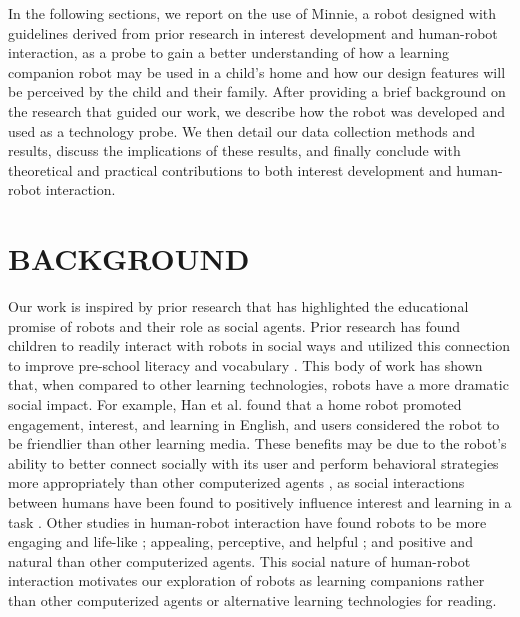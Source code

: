 \documentclass{sigchi}
\begin{document}


In the following sections, we report on the use of Minnie, a robot designed with guidelines derived from prior research in interest development and human-robot interaction, as a probe to gain a better understanding of how a learning companion robot may be used in a child's home and how our design features will be perceived by the child and their family. After providing a brief background on the research that guided our work, we describe how the robot was developed and used as a technology probe. We then detail our data collection methods and results, discuss the implications of these results, and finally conclude with theoretical and practical contributions to both interest development and human-robot interaction.

\section{BACKGROUND}
Our work is inspired by prior research that has highlighted the educational promise of robots and their role as social agents. Prior research has found children to readily interact with robots in social ways and utilized this connection to improve pre-school literacy \cite{Kory:2014} and vocabulary \cite{Spaulding:2016}. This body of work has shown that, when compared to other learning technologies, robots have a more dramatic social impact. For example, Han et al. \cite{Han:2005} found that a home robot promoted engagement, interest, and learning in English, and users considered the robot to be friendlier than other learning media. These benefits may be due to the robot's ability to better connect socially with its user and perform behavioral strategies more appropriately than other computerized agents \cite{Brown:2013}, as social interactions between humans have been found to positively influence interest and learning in a task \cite{Sansone:2005}. Other studies in human-robot interaction have found robots to be more engaging and life-like \cite{Kiesler:2008}; appealing, perceptive, and helpful \cite{Wainer:2007}; and positive and natural \cite{Bainbridge:2011} than other computerized agents. This social nature of human-robot interaction motivates our exploration of robots as learning companions rather than other computerized agents or alternative learning technologies for reading. 
\end{document}
